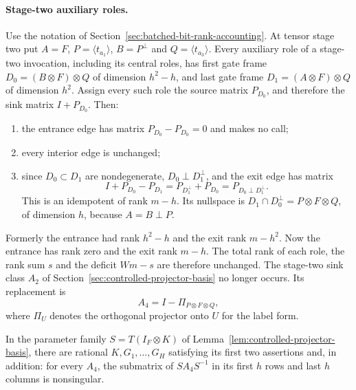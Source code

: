 \paragraph{Stage-two auxiliary roles.}
Use the notation of Section~\ref{sec:batched-bit-rank-accounting}.
At tensor stage two put $A=F$, $P=\langle t_{a_1}\rangle$, $B=P^\perp$ and
$Q=\langle t_{a_3}\rangle$. Every auxiliary role of a stage-two invocation,
including its central roles, has first gate frame
$D_0=(B\otimes F)\otimes Q$ of dimension $h^2-h$, and last gate frame
$D_1=(A\otimes F)\otimes Q$ of dimension $h^2$. Assign every such role the
source matrix $P_{D_0}$, and therefore the sink matrix $I+P_{D_0}$. Then:
\begin{enumerate}
\item the entrance edge has matrix $P_{D_0}-P_{D_0}=0$ and makes no call;
\item every interior edge is unchanged;
\item since $D_0\subset D_1$ are nondegenerate, $D_0\perp D_1^\perp$, and
the exit edge has matrix
\[
 I+P_{D_0}-P_{D_1}=P_{D_1^\perp}+P_{D_0}=P_{D_0\perp D_1^\perp}.
\]
This is an idempotent of rank $m-h$. Its nullspace is
$D_1\cap D_0^\perp=P\otimes F\otimes Q$, of dimension $h$, because
$A=B\perp P$.
\end{enumerate}
Formerly the entrance had rank $h^2-h$ and the exit rank $m-h^2$. Now the
entrance has rank zero and the exit rank $m-h$. The total rank of each role,
the rank sum $s$ and the deficit $Wm-s$ are therefore unchanged. The
stage-two sink class $A_2$ of Section~\ref{sec:controlled-projector-basis}
no longer occurs. Its replacement is
\[
 A_4=I-\Pi_{P\otimes F\otimes Q},
\]
where $\Pi_U$ denotes the orthogonal projector onto $U$ for the label form.

\begin{lemma}
\label{lem:source-frame-basis}
In the parameter family $S=T(I_F\otimes K)$ of
Lemma~\ref{lem:controlled-projector-basis}, there are rational
$K,G_1,\ldots,G_H$ satisfying its first two assertions and, in addition:
for every $A_4$, the submatrix of $SA_4S^{-1}$ in its first $h$ rows and
last $h$ columns is nonsingular.
\end{lemma}

